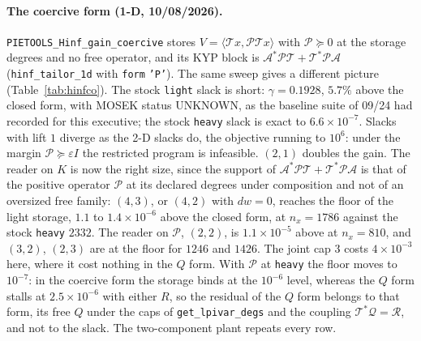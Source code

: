 \documentclass[12pt]{article}
\newcommand{\mcl}[1]{\mathcal{#1}}
\newcommand{\code}[1]{\texttt{#1}}
\theoremstyle{plain}
\theoremstyle{definition}
\theoremstyle{remark}
\begin{document}
\paragraph{The coercive form (1-D, 10/08/2026).} \code{PIETOOLS\_Hinf\_gain\_coercive} stores $V=\langle\mcl Tx,\mcl P\mcl Tx\rangle$ with $\mcl P\succeq0$ at the storage degrees and no free operator, and its KYP block is $\mcl A^*\mcl P\mcl T+\mcl T^*\mcl P\mcl A$ (\code{hinf\_tailor\_1d} with \code{form} \code{'P'}). The same sweep gives a different picture (Table~\ref{tab:hinfco}). The stock \code{light} slack is short: $\gamma=0.1928$, $5.7\%$ above the closed form, with MOSEK status UNKNOWN, as the baseline suite of 09/24 had recorded for this executive; the stock \code{heavy} slack is exact to $6.6\times10^{-7}$. Slacks with lift $1$ diverge as the 2-D slacks do, the objective running to $10^{6}$: under the margin $\mcl P\succeq\varepsilon I$ the restricted program is infeasible. $(2,1)$ doubles the gain. The reader on $K$ is now the right size, since the support of $\mcl A^*\mcl P\mcl T+\mcl T^*\mcl P\mcl A$ is that of the positive operator $\mcl P$ at its declared degrees under composition and not of an oversized free family: $(4,3)$, or $(4,2)$ with $dw=0$, reaches the floor of the light storage, $1.1$ to $1.4\times10^{-6}$ above the closed form, at $n_x=1786$ against the stock \code{heavy} $2332$. The reader on $\mcl P$, $(2,2)$, is $1.1\times10^{-5}$ above at $n_x=810$, and $(3,2)$, $(2,3)$ are at the floor for $1246$ and $1426$. The joint cap $3$ costs $4\times10^{-3}$ here, where it cost nothing in the $Q$ form. With $\mcl P$ at \code{heavy} the floor moves to $10^{-7}$: in the coercive form the storage binds at the $10^{-6}$ level, whereas the $Q$ form stalls at $2.5\times10^{-6}$ with either $R$, so the residual of the $Q$ form belongs to that form, its free $Q$ under the caps of \code{get\_lpivar\_degs} and the coupling $\mcl T^*\mcl Q=\mcl R$, and not to the slack. The two-component plant repeats every row.
\end{document}
